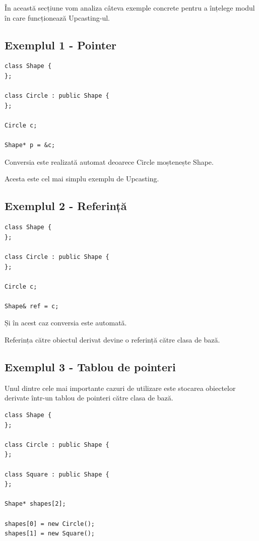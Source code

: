 \documentclass[12pt,a4paper]{article}
\begin{document}
În această secțiune vom analiza câteva exemple concrete pentru a înțelege modul în care funcționează Upcasting-ul.

\subsection{Exemplul 1 - Pointer}

\begin{verbatim}
class Shape {
};

class Circle : public Shape {
};

Circle c;

Shape* p = &c;
\end{verbatim}

Conversia este realizată automat deoarece Circle moștenește Shape.

Acesta este cel mai simplu exemplu de Upcasting.

\subsection{Exemplul 2 - Referință}

\begin{verbatim}
class Shape {
};

class Circle : public Shape {
};

Circle c;

Shape& ref = c;
\end{verbatim}

Și în acest caz conversia este automată.

Referința către obiectul derivat devine o referință către clasa de bază.

\subsection{Exemplul 3 - Tablou de pointeri}

Unul dintre cele mai importante cazuri de utilizare este stocarea obiectelor derivate într-un tablou de pointeri către clasa de bază.

\begin{verbatim}
class Shape {
};

class Circle : public Shape {
};

class Square : public Shape {
};

Shape* shapes[2];

shapes[0] = new Circle();
shapes[1] = new Square();
\end{verbatim}
\end{document}
